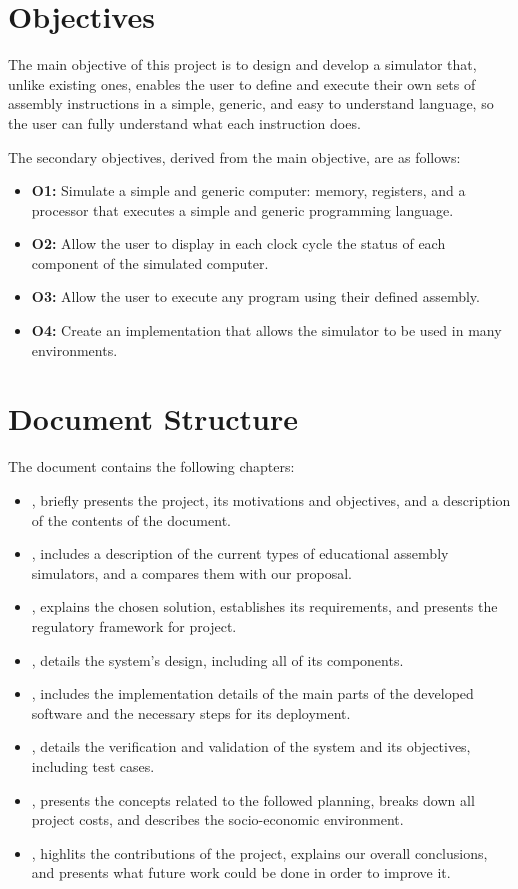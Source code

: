 \section{Objectives}\label{sec:objectives}
The main objective of this project is to design and develop a simulator that, unlike existing ones, enables the user to define and execute their own sets of \gls{assembly} instructions in a simple, generic, and easy to understand language, so the user can fully understand what each instruction does.

\noindent
The secondary objectives, derived from the main objective, are as follows:
\begin{itemize}
  \item \textbf{O1:} Simulate a simple and generic computer: \gls{memory}, \glspl{register}, and a \gls{processor} that executes a simple and generic \gls{programming language}.
  \item \textbf{O2:} Allow the user to display in each \gls{clock cycle} the status of each component of the simulated
  computer.
  \item \textbf{O3:} Allow the user to execute any program using their defined \gls{assembly}.
  \item \textbf{O4:} Create an implementation that allows the simulator to be used in many environments.
\end{itemize}


\section{Document Structure}\label{sec:structure}
The document contains the following chapters:
\begin{itemize}
  \item {}, briefly presents the project, its motivations and objectives, and a description of the contents of the document.
  \item {}, includes a description of the current types of educational \gls{assembly} simulators, and a compares them with our proposal.
  \item {}, explains the chosen solution, establishes its requirements, and presents the regulatory framework for project.
  \item {}, details the system's design, including all of its components.
  \item {}, includes the implementation details of the main parts of the developed software and the necessary steps for its deployment.
  \item {}, details the verification and validation of the system and its objectives, including test cases.
  \item {}, presents the concepts related to the followed planning, breaks down all project costs, and describes the socio-economic environment.
  \item {}, highlits the contributions of the project, explains our overall conclusions, and presents what future work could be done in order to improve it.
\end{itemize}